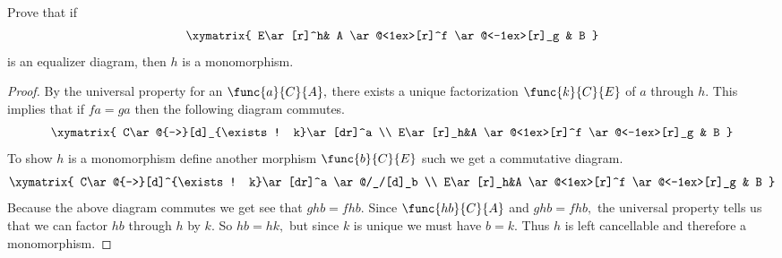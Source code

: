 \documentclass[main.tex]{subfiles}
\begin{document}
\paragraph{}
\begin{exercise}
	Prove that if
	$$
	\xymatrix{
		E\ar[r]^h&
		A  \ar@<1ex>[r]^f
		\ar@<-1ex>[r]_g
		& B  }
	$$
	is an equalizer diagram, then $ h $ is a monomorphism.
\end{exercise}
\begin{proof}
	By the universal property for an $ \func{a}{C}{A},$ there exists a unique
	factorization $ \func{k}{C}{E} $ of $ a $ through $ h. $ This implies that if $ fa=ga $ then the following diagram commutes.
	$$
	\xymatrix{
		C\ar@{-->}[d]_{\exists! k}\ar[dr]^a  \\
		E\ar[r]_h&A  \ar@<1ex>[r]^f
		\ar@<-1ex>[r]_g
		& B }
	$$
	To show $ h $ is a monomorphism define another morphism $\func{b}{C}{E} $
	such we get a commutative diagram.
	$$
	\xymatrix{
		C\ar@{-->}[d]^{\exists! k}\ar[dr]^a \ar@/_/[d]_b  \\
		E\ar[r]_h&A  \ar@<1ex>[r]^f
		\ar@<-1ex>[r]_g
		& B }
	$$
	Because the above diagram commutes we get see that $ ghb=fhb. $ Since $ 
	\func{hb}{C}{A} $ and $ ghb=fhb, $ the universal property tells us that we 
	can factor $ hb $ through $ h $ by $ k. $ So $ hb=hk, $ but since $ k $ is 
	unique we must have $ b=k. $ Thus $ h $ is left cancellable and therefore a 
	monomorphism.
	
\end{proof}
\end{document}
